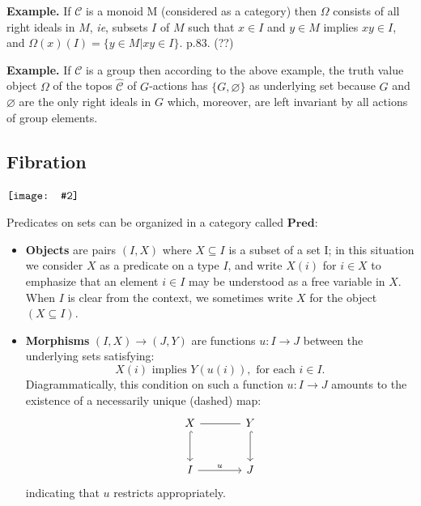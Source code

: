 \documentclass[12pt, orivec]{article}
\newcommand{\book}[1]{$\NewSym[0.4]{../book-icon.png} \quad$ \parbox{0.9\textwidth}{\footnotesize #1}}
\newcommand*\NewSym[2][0.5]{\vcenter{\hbox{\texttt{[image: \#2]}}}}
\begin{document}
\textbf{Example.}  If $\mathscr{C}$ is a monoid M (considered as a category) then $\Omega$ consists of all right ideals in $M$, \textit{ie}, subsets $I$ of $M$ such that $x \in I$ and $y \in M$ implies $xy \in I$, and $\Omega(x)(I) = \{ y \in M | xy \in I \}$. \parencite{Streicher2006} p.83. {\color{red}(??)}

\textbf{Example.}  If $\mathscr{C}$ is a group then according to the above example, the truth value object $\Omega$ of the topos $\widehat{\mathscr{C}}$ of $G$-actions has $\{ G, \varnothing \}$ as underlying set because $G$ and $\varnothing$ are the only right ideals in $G$ which, moreover, are left invariant by all actions of group elements.

\subsection{Fibration}

\book{\parencite{Jacobs1999}}

Predicates on sets can be organized in a category called $\mathbf{Pred}$:
\begin{itemize}
\item \textbf{Objects} are pairs $(I, X)$ where $X \subseteq I$ is a subset of a set I; in this situation we consider $X$ as a predicate on a type $I$, and write $X(i)$ for $i \in X$ to emphasize that an element $i \in I$ may be understood as a free variable in $X$.  When $I$ is clear from the context, we sometimes write $X$ for the object $(X \subseteq I)$.

\item \textbf{Morphisms} $(I,X) \rightarrow (J,Y)$ are functions $u: I \rightarrow J$ between the underlying sets satisfying:
\begin{equation}
X(i) \mbox{ implies } Y(u(i)), \mbox{ for each } i \in I.
\end{equation}
Diagrammatically, this condition on such a function $u: I \rightarrow J$ amounts to the existence of a necessarily unique (dashed) map:
\begin{equation}
\begin{tikzcd}[column sep = large, row sep = large]
X \arrow[r, dash] \arrow[d, hook]
	& Y \arrow[d, hook] \\
I \arrow[r, "u"] & J
\end{tikzcd}
\end{equation}
indicating that $u$ restricts appropriately.
\end{itemize}
\end{document}
